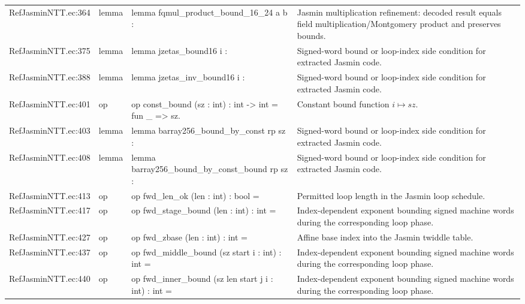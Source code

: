 \documentclass[10pt]{article}
\begin{document}
\begin{longtable}{L{0.11\textwidth}L{0.05\textwidth}L{0.38\textwidth}L{0.42\textwidth}}
RefJasminNTT.\allowbreak{}ec:\allowbreak{}364 & lemma & {\ttfamily\scriptsize lemma fqmul\_product\_bound\_16\_24 a b :} & Jasmin multiplication refinement: decoded result equals field multiplication/Montgomery product and preserves bounds. \\
RefJasminNTT.\allowbreak{}ec:\allowbreak{}375 & lemma & {\ttfamily\scriptsize lemma jzetas\_bound16 i :} & Signed-word bound or loop-index side condition for extracted Jasmin code. \\
RefJasminNTT.\allowbreak{}ec:\allowbreak{}388 & lemma & {\ttfamily\scriptsize lemma jzetas\_inv\_bound16 i :} & Signed-word bound or loop-index side condition for extracted Jasmin code. \\
RefJasminNTT.\allowbreak{}ec:\allowbreak{}401 & op & {\ttfamily\scriptsize op const\_bound (sz : int) : int -> int = fun \_ => sz.} & Constant bound function $i\mapsto sz$. \\
RefJasminNTT.\allowbreak{}ec:\allowbreak{}403 & lemma & {\ttfamily\scriptsize lemma barray256\_bound\_by\_const rp sz :} & Signed-word bound or loop-index side condition for extracted Jasmin code. \\
RefJasminNTT.\allowbreak{}ec:\allowbreak{}408 & lemma & {\ttfamily\scriptsize lemma barray256\_bound\_by\_const\_bound rp sz :} & Signed-word bound or loop-index side condition for extracted Jasmin code. \\
RefJasminNTT.\allowbreak{}ec:\allowbreak{}413 & op & {\ttfamily\scriptsize op fwd\_len\_ok (len : int) : bool =} & Permitted loop length in the Jasmin loop schedule. \\
RefJasminNTT.\allowbreak{}ec:\allowbreak{}417 & op & {\ttfamily\scriptsize op fwd\_stage\_bound (len : int) : int =} & Index-dependent exponent bounding signed machine words during the corresponding loop phase. \\
RefJasminNTT.\allowbreak{}ec:\allowbreak{}427 & op & {\ttfamily\scriptsize op fwd\_zbase (len : int) : int =} & Affine base index into the Jasmin twiddle table. \\
RefJasminNTT.\allowbreak{}ec:\allowbreak{}437 & op & {\ttfamily\scriptsize op fwd\_middle\_bound (sz start i : int) : int =} & Index-dependent exponent bounding signed machine words during the corresponding loop phase. \\
RefJasminNTT.\allowbreak{}ec:\allowbreak{}440 & op & {\ttfamily\scriptsize op fwd\_inner\_bound (sz len start j i : int) : int =} & Index-dependent exponent bounding signed machine words during the corresponding loop phase. \\

\end{longtable}
\end{document}
